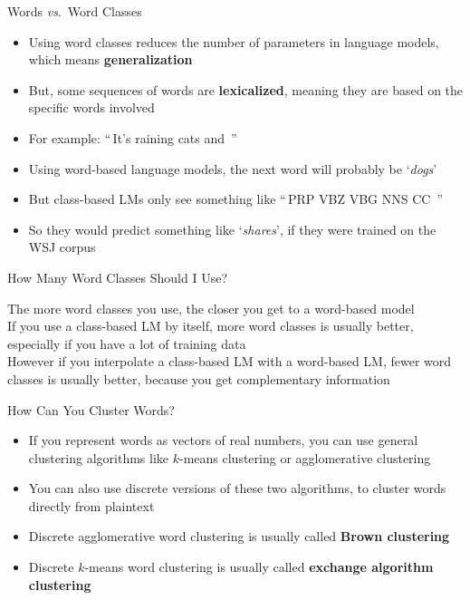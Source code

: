 \documentclass[xcolor=pdftex,x11names,table,hyperref]{beamer}
\begin{document}
\begin{frame}{Words \textit{vs}.\ Word Classes}
\begin{itemize}
	\item Using word classes reduces the number of parameters in language models, which means \textbf{generalization}
	\pause
	\item But, some sequences of words are \textbf{lexicalized}, meaning they are based on the specific words involved
	\pause
	\item For example:   ``\,It's raining cats and \underline{\hspace{2em}}\,''
	\pause
	\item Using word-based language models, the next word will probably be `\textit{dogs}'
	\pause
	\item But class-based LMs only see something like ``\,PRP VBZ VBG NNS CC \underline{\hspace{2em}}\,''
	\item So they would predict something like `\textit{shares}', if they were trained on the WSJ corpus
\end{itemize}
\end{frame}

\begin{frame}{How Many Word Classes Should I Use?}
	\begin{large}
	The more word classes you use, the closer you get to a word-based model \\[1.0em]

	\pause
	If you use a class-based LM by itself, more word classes is usually better, especially if you have a lot of training data \\[1.0em]

	\pause
	However if you interpolate a class-based LM with a word-based LM, fewer word classes is usually better, because you get complementary information
	\end{large}
\end{frame}

\begin{frame}{How Can You Cluster Words?}
\begin{itemize}
	\item If you represent words as vectors of real numbers, you can use general clustering algorithms like $k$-means clustering or agglomerative clustering
	\pause
	\item You can also use discrete versions of these two algorithms, to cluster words directly from plaintext
	\pause
	\item Discrete agglomerative word clustering is usually called \textbf{Brown clustering}
	\item Discrete $k$-means word clustering is usually called \textbf{exchange algorithm clustering}
\end{itemize}
\end{frame}
\end{document}
